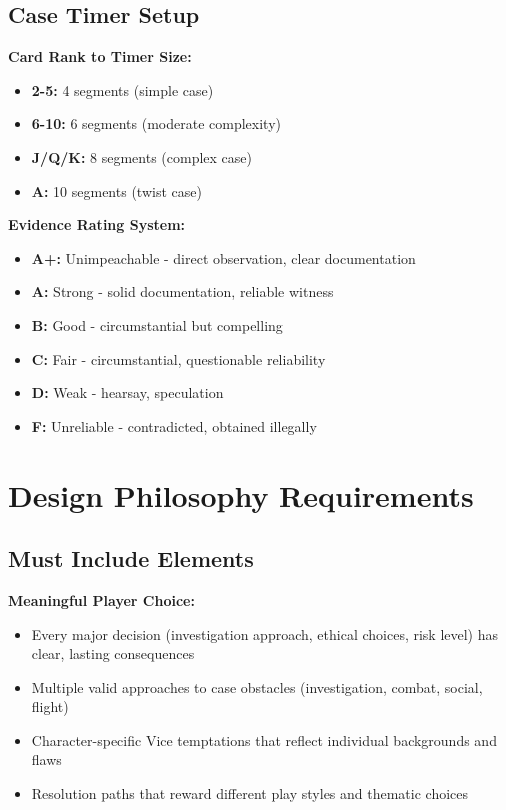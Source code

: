 \documentclass[11pt]{article}
\begin{document}
\subsection{Case Timer Setup}

\textbf{Card Rank to Timer Size:}
\begin{itemize}
\item \textbf{2-5:} 4 segments (simple case)
\item \textbf{6-10:} 6 segments (moderate complexity)
\item \textbf{J/Q/K:} 8 segments (complex case)
\item \textbf{A:} 10 segments (twist case)
\end{itemize}

\textbf{Evidence Rating System:}
\begin{itemize}
\item \textbf{A+:} Unimpeachable - direct observation, clear documentation
\item \textbf{A:} Strong - solid documentation, reliable witness
\item \textbf{B:} Good - circumstantial but compelling
\item \textbf{C:} Fair - circumstantial, questionable reliability
\item \textbf{D:} Weak - hearsay, speculation
\item \textbf{F:} Unreliable - contradicted, obtained illegally
\end{itemize}

\section{Design Philosophy Requirements}

\subsection{Must Include Elements}

\textbf{Meaningful Player Choice:}
\begin{itemize}
\item Every major decision (investigation approach, ethical choices, risk level) has clear, lasting consequences
\item Multiple valid approaches to case obstacles (investigation, combat, social, flight)
\item Character-specific Vice temptations that reflect individual backgrounds and flaws
\item Resolution paths that reward different play styles and thematic choices
\end{itemize}
\end{document}
